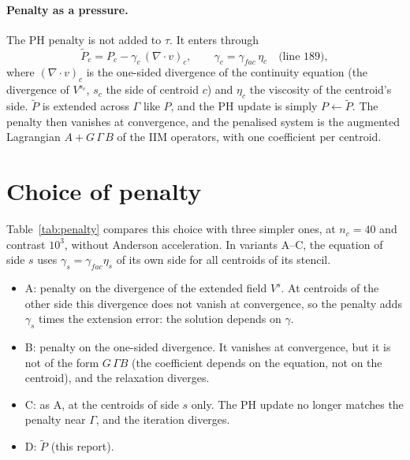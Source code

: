 \documentclass[11pt,a4paper]{article}
\begin{document}
\paragraph{Penalty as a pressure.} The PH penalty is not added to $\tau$. It enters through
\[
\tilde P_c=P_c-\gamma_c\,(\nabla\cdot v)_c,\qquad \gamma_c=\gamma_{fac}\,\eta_c
\quad\text{(line~189)},
\]
where $(\nabla\cdot v)_c$ is the one-sided divergence of the continuity equation (the divergence
of $V^{s_c}$, $s_c$ the side of centroid $c$) and $\eta_c$ the viscosity of the centroid's side.
$\tilde P$ is extended across $\Gamma$ like $P$, and the PH update is simply
$P\leftarrow\tilde P$. The penalty then vanishes at convergence, and the penalised system is the
augmented Lagrangian $A+G\,\Gamma\,B$ of the IIM operators, with one coefficient per centroid.

\section{Choice of penalty}

Table~\ref{tab:penalty} compares this choice with three simpler ones, at $n_c=40$ and contrast
$10^3$, without Anderson acceleration. In variants A--C, the equation of side $s$ uses
$\gamma_s=\gamma_{fac}\eta_s$ of its own side for all centroids of its stencil.
\begin{itemize}
  \item A: penalty on the divergence of the extended field $V^s$. At centroids of the other side
    this divergence does not vanish at convergence, so the penalty adds $\gamma_s$ times the
    extension error: the solution depends on $\gamma$.
  \item B: penalty on the one-sided divergence. It vanishes at convergence, but it is not of the
    form $G\,\Gamma B$ (the coefficient depends on the equation, not on the centroid), and the
    relaxation diverges.
  \item C: as A, at the centroids of side $s$ only. The PH update no longer matches the
    penalty near $\Gamma$, and the iteration diverges.
  \item D: $\tilde P$ (this report).
\end{itemize}
\end{document}
